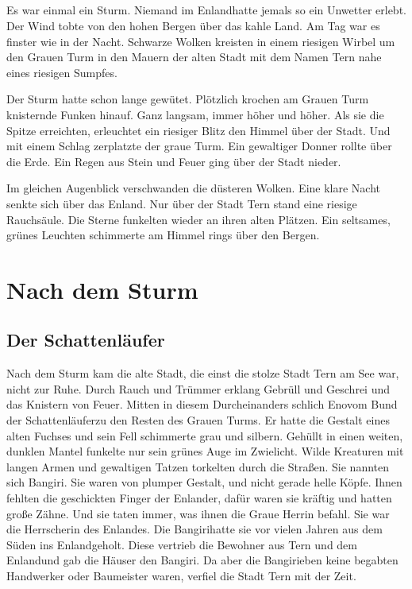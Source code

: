 \documentclass[12pt,a4paper,onecolumn,twoside,ngerman]{book}
\newcommand{\Tern}{Tern }
\newcommand{\Bangiri}{Bangiri}
\newcommand{\Enland}{Enland}
\newcommand{\Schattenjager}{Schattenläufer}
\newcommand{\Eno}{Eno}
\begin{document}
  
  


\paragraph{}
Es war einmal ein Sturm.
Niemand im \Enland hatte jemals so ein Unwetter erlebt. Der Wind tobte von den hohen Bergen über das kahle Land. Am Tag war es finster wie in der Nacht. Schwarze Wolken kreisten in einem riesigen Wirbel um den Grauen Turm in den Mauern der alten Stadt mit dem Namen \Tern nahe eines riesigen Sumpfes. 

Der Sturm hatte schon lange gewütet. Plötzlich krochen am Grauen Turm knisternde Funken hinauf. Ganz langsam, immer höher und höher. Als sie die Spitze erreichten, erleuchtet ein riesiger Blitz den Himmel über der Stadt. Und mit einem Schlag zerplatzte der graue Turm. Ein gewaltiger Donner rollte über die Erde. Ein Regen aus Stein und Feuer ging über der Stadt nieder. 

Im gleichen Augenblick verschwanden die düsteren Wolken. Eine klare Nacht senkte sich über das \Enland. Nur über der Stadt \Tern stand eine riesige Rauchsäule. Die Sterne funkelten wieder an ihren alten Plätzen. Ein seltsames, grünes Leuchten schimmerte am Himmel rings über den Bergen.

\chapter{Nach dem Sturm}
\section{Der \Schattenjager}
Nach dem Sturm kam die alte Stadt, die einst die stolze Stadt \Tern am See war, nicht zur Ruhe. 
Durch Rauch und Trümmer erklang Gebrüll und Geschrei und das Knistern von Feuer. Mitten in diesem Durcheinanders schlich \Eno vom Bund der \Schattenjager zu den Resten des Grauen Turms. Er hatte die Gestalt eines alten Fuchses und sein Fell schimmerte grau und silbern. Gehüllt in einen weiten, dunklen Mantel funkelte nur sein grünes Auge im Zwielicht. Wilde Kreaturen mit langen Armen und gewaltigen Tatzen torkelten durch die Straßen. Sie nannten sich \Bangiri{.} Sie waren von plumper Gestalt, und nicht gerade helle Köpfe. Ihnen fehlten die geschickten Finger der \Enland{er}, dafür waren sie kräftig und hatten große Zähne. Und sie taten immer, was ihnen die Graue Herrin befahl. Sie war die Herrscherin des \Enland{es}. Die \Bangiri hatte sie vor vielen Jahren aus dem Süden ins \Enland geholt. Diese vertrieb die Bewohner aus \Tern und dem \Enland und gab die Häuser den \Bangiri. Da aber die \Bangiri eben keine begabten Handwerker oder Baumeister waren, verfiel die Stadt \Tern mit der Zeit. 
\end{document}
